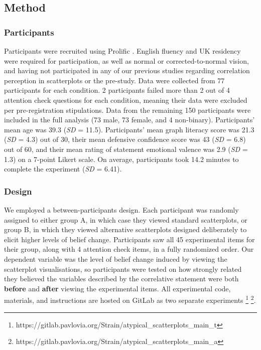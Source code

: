 \documentclass[sigconf]{acmart}
\begin{document}
\subsection{Method}\label{sec-method-main}

\subsubsection{Participants}\label{sec-participants-main}

Participants were recruited using Prolific \citep{prolific}. English
fluency and UK residency were required for participation, as well as
normal or corrected-to-normal vision, and having not participated in any
of our previous studies regarding correlation perception in scatterplots
\citep{strain_2023, strain_2023b, strain_2024} or the pre-study. Data
were collected from 77 participants for each condition. 2 participants
failed more than 2 out of 4 attention check questions for each
condition, meaning their data were excluded per pre-registration
stipulations. Data from the remaining 150 participants were included in
the full analysis (73 male, 73 female, and 4 non-binary). Participants'
mean age was 39.3 (\emph{SD} = 11.5). Participants' mean graph literacy
score was 21.3 (\emph{SD} = 4.3) out of 30, their mean defensive
confidence score was 43 (\emph{SD} = 6.8) out of 60, and their mean
rating of statement emotional valence was 2.9 (\emph{SD} = 1.3) on a
7-point Likert scale. On average, participants took 14.2 minutes to
complete the experiment (\emph{SD} = 6.41).

\subsubsection{Design}\label{sec-design-main}

We employed a between-participants design. Each participant was randomly
assigned to either group A, in which case they viewed standard
scatterplots, or group B, in which they viewed alternative scatterplots
designed deliberately to elicit higher levels of belief change.
Participants saw all 45 experimental items for their group, along with 4
attention check items, in a fully randomized order. Our dependent
variable was the level of belief change induced by viewing the
scatterplot visualisations, so participants were tested on how strongly
related they believed the variables described by the correlative
statement were both \textbf{before} and \textbf{after} viewing the
experimental items. All experimental code, materials, and instructions
are hosted on GitLab as two separate experiments \footnote{https://gitlab.pavlovia.org/Strain/atypical\_scatterplots\_main\_t}
\footnote{https://gitlab.pavlovia.org/Strain/atypical\_scatterplots\_main\_a}.
\end{document}

